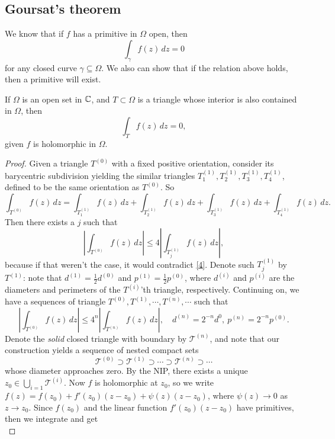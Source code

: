\subsection{Goursat's theorem}
We know that if $f$ has a primitive in $\Omega$ open, then \[
    \int_{\gamma}^{} f(z) \, dz=0
\] for any closed curve $\gamma \subseteq \Omega$. We also can show that if the relation above holds, then a primitive will exist.
\begin{theorem}
If $\Omega$ is an open set in $\mathbb{C}$, and $T \subset \Omega$ is a triangle whose interior is also contained in $\Omega$, then \[
    \int_{T}^{} f(z) \, dz=0,
\] given $f$ is holomorphic in $\Omega$.
\end{theorem}
\begin{proof}
    Given a triangle $T^{(0)}$ with a fixed positive orientation, consider its barycentric subdivision yielding the similar triangles $T_1^{(1)},T_2^{(1)},T_3^{(1)},T_4^{(1)}$, defined to be the same orientation as $T^{(0)}$. So 
    \begin{equation}\label{4}
        \int_{T^{(0)}}^{} f(z) \, dz=\int_{T_1^{(1)}}^{} f(z) \, dz + \int_{T_2^{(1)}}^{} f(z) \, dz + \int_{T_3^{(1)}}^{} f(z) \, dz + \int_{T_4^{(1)}}^{} f(z) \, dz.
    \end{equation}
     Then there exists a $j$ such that \[
    \left| \int_{T^{(0)}}^{} f(z) \, dz \right| \leq 4 \left| \int_{T_j ^{(1)}}^{} f(z) \, dz \right| ,
\] because if that weren't the case, it would contradict \cref{4}. Denote such $T_j ^{(1)}$ by $T^{(1)}$: note that $d^{(1)}=\frac{1}{2}d^{(0)}$ and $p^{(1)}=\frac{1}{2}p^{(0)}$, where $d^{(i)}$ and $p^{(i)}$ are the diameters and perimeters of the $T^{(i)}$'th triangle, respectively. Continuing on, we have a sequences of triangle $T^{(0)},T^{(1)},\cdots ,T^{(n)},\cdots $ such that \[
\left| \int_{T^{(0)}}^{} f(z) \, dz \right| \leq 4^n \left| \int_{T^{(n)}}^{} f(z) \, dz \right|,\quad d^{(n)}=2^{-n}d^{0}, \ p^{(n)}=2^{-n}p^{(0)}.
\] Denote the \emph{solid} closed triangle with boundary by $\mathcal{T} ^{(n)}$, and note that our construction yields a sequence of nested compact sets \[
\mathcal{T} ^{(0)}\supset \mathcal{T} ^{(1)}\supset \cdots \supset \mathcal{T} ^{(n)}\supset \cdots 
\] whose diameter approaches zero. By the NIP, there exists a unique $z_0\in \bigcup_{i=1}\mathcal{T} ^{(i)}$. Now $f$ is holomorphic at $z_0$, so we write $f(z)=f(z_0)+f'(z_0)(z-z_0)+\psi(z)(z-z_0)$, where $\psi(z)\to 0$ as $z\to z_0$. Since $f(z_0)$ and the linear function $f'(z_0)(z-z_0)$ have primitives, then we integrate and get \[
\]
\end{proof}
